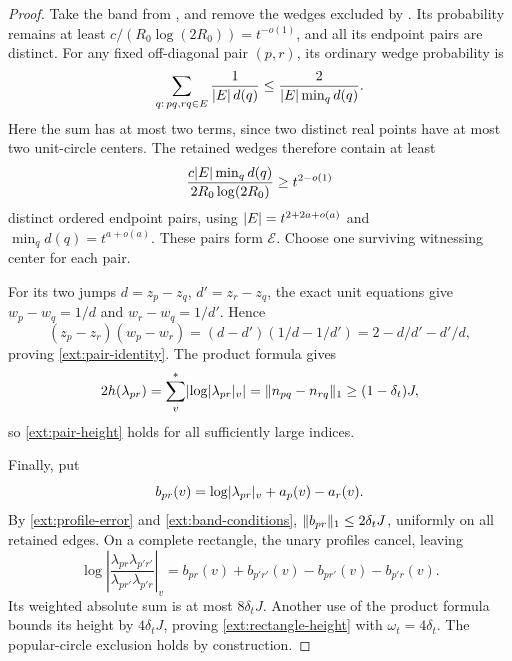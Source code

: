 \begin{proof}
Take the band from , and remove the wedges excluded by
.  Its probability remains at least
\(c/(R_0\log(2R_0))=t^{-o(1)}\), and all its endpoint pairs are distinct.
For any fixed off-diagonal pair \((p,r)\), its ordinary wedge probability is
\[
 \sum_{q:\,pq,rq\in E}\frac{1}{\lvert E\rvert\,d(q)}
 \le\frac{2}{\lvert E\rvert\min_qd(q)}.
\]
Here the sum has at most two terms, since two distinct real points have
at most two unit-circle centers.  The retained wedges therefore contain
at least
\[
 \frac{c\lvert E\rvert\min_qd(q)}{2R_0\log(2R_0)}\ge t^{2-o(1)}
\]
distinct ordered endpoint pairs, using
\(\lvert E\rvert=t^{2+2a+o(a)}\) and \(\min_qd(q)=t^{a+o(a)}\).
These pairs form \(\mathcal E\).  Choose one surviving witnessing
center for each pair.

For its two jumps \(d=z_p-z_q\), \(d'=z_r-z_q\), the exact unit equations
give \(w_p-w_q=1/d\) and \(w_r-w_q=1/d'\).  Hence
\[
 (z_p-z_r)(w_p-w_r)=(d-d')(1/d-1/d')
                    =2-d/d'-d'/d,
\]
proving \eqref{ext:pair-identity}.  The product formula gives
\[
 2h(\lambda_{pr})=\sum_v^*\lvert \log\lvert \lambda_{pr}\rvert_v\rvert
                  =\lVert n_{pq}-n_{rq}\rVert_1
                  \ge(1-\delta_t)J,
\]
so \eqref{ext:pair-height} holds for all sufficiently large indices.

Finally, put
\[
 b_{pr}(v)=\log\lvert \lambda_{pr}\rvert_v+a_p(v)-a_r(v).
\]
By \eqref{ext:profile-error} and \eqref{ext:band-conditions},
\(\lVert b_{pr}\rVert_1\le2\delta_tJ\), uniformly on all retained edges.
On a complete rectangle, the unary profiles cancel, leaving
\[
 \log\left|\frac{\lambda_{pr}\lambda_{p'r'}}
                    {\lambda_{pr'}\lambda_{p'r}}\right|_v
     =b_{pr}(v)+b_{p'r'}(v)-b_{pr'}(v)-b_{p'r}(v).
\]
Its weighted absolute sum is at most \(8\delta_tJ\).  Another use of the
product formula bounds its height by \(4\delta_tJ\), proving
\eqref{ext:rectangle-height} with \(\omega_t=4\delta_t\).
The popular-circle exclusion holds by construction.
\end{proof}

